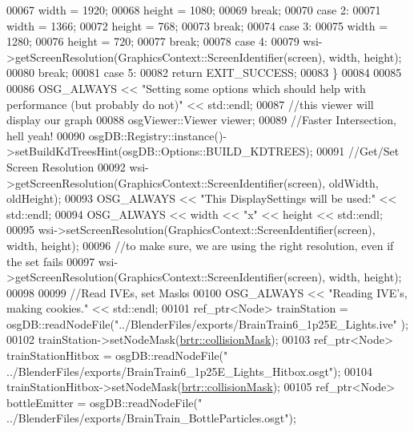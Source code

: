 \begin{DoxyCode}
00067         width = 1920;
00068         height = 1080;
00069         \textcolor{keywordflow}{break};
00070     \textcolor{keywordflow}{case} 2:
00071         width = 1366;
00072         height = 768;
00073         \textcolor{keywordflow}{break};
00074     \textcolor{keywordflow}{case} 3:
00075         width = 1280;
00076         height = 720;
00077         \textcolor{keywordflow}{break};
00078     \textcolor{keywordflow}{case} 4:
00079         wsi->getScreenResolution(GraphicsContext::ScreenIdentifier(screen), width, height);
00080         \textcolor{keywordflow}{break};
00081     \textcolor{keywordflow}{case} 5:
00082         \textcolor{keywordflow}{return} EXIT\_SUCCESS;
00083     \}
00084       
00085     
00086     OSG\_ALWAYS << \textcolor{stringliteral}{"Setting some options which should help with performance (but probably do not)"} << 
      std::endl;
00087     \textcolor{comment}{//this viewer will display our graph}
00088     osgViewer::Viewer viewer;
00089     \textcolor{comment}{//Faster Intersection, hell yeah!}
00090     osgDB::Registry::instance()->setBuildKdTreesHint(osgDB::Options::BUILD\_KDTREES);
00091     \textcolor{comment}{//Get/Set Screen Resolution }
00092     wsi->getScreenResolution(GraphicsContext::ScreenIdentifier(screen), oldWidth, oldHeight);
00093     OSG\_ALWAYS << \textcolor{stringliteral}{"This DisplaySettings will be used:"} << std::endl;
00094     OSG\_ALWAYS << width << \textcolor{stringliteral}{"x"} << height << std::endl;
00095     wsi->setScreenResolution(GraphicsContext::ScreenIdentifier(screen), width, height);
00096     \textcolor{comment}{//to make sure, we are using the right resolution, even if the set fails}
00097     wsi->getScreenResolution(GraphicsContext::ScreenIdentifier(screen), width, height);
00098 
00099     \textcolor{comment}{//Read IVEs, set Masks}
00100     OSG\_ALWAYS << \textcolor{stringliteral}{"Reading IVE's, making cookies."} << std::endl;
00101     ref\_ptr<Node> trainStation = osgDB::readNodeFile(\textcolor{stringliteral}{"../BlenderFiles/exports/BrainTrain6\_1p25E\_Lights.ive"}
      );
00102     trainStation->setNodeMask(\hyperlink{namespacebrtr_af79a815819e2ef65ea9cd43dc9d43679}{brtr::collisionMask});
00103     ref\_ptr<Node> trainStationHitbox = osgDB::readNodeFile(\textcolor{stringliteral}{"
      ../BlenderFiles/exports/BrainTrain6\_1p25E\_Lights\_Hitbox.osgt"});
00104     trainStationHitbox->setNodeMask(\hyperlink{namespacebrtr_af79a815819e2ef65ea9cd43dc9d43679}{brtr::collisionMask});
00105     ref\_ptr<Node> bottleEmitter = osgDB::readNodeFile(\textcolor{stringliteral}{"
      ../BlenderFiles/exports/BrainTrain\_BottleParticles.osgt"});

\end{DoxyCode}
